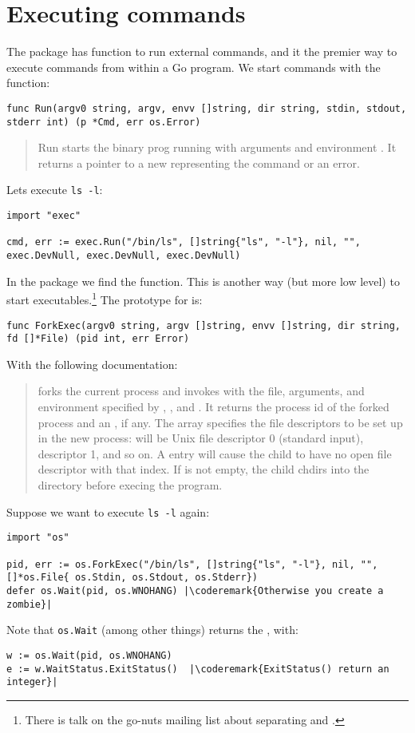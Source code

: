 \section{Executing commands}
The  package has function to run external commands, and it the premier way to
execute commands from within a Go program. We start commands with 
the  function:
\begin{lstlisting}
func Run(argv0 string, argv, envv []string, dir string, stdin, stdout, stderr int) (p *Cmd, err os.Error)
\end{lstlisting}
\begin{quote}
Run starts the binary prog running with
arguments  and environment .
It returns a pointer to a new  representing the command or an error.
\end{quote}
Lets execute \verb|ls -l|:
\begin{lstlisting}
import "exec"

cmd, err := exec.Run("/bin/ls", []string{"ls", "-l"}, nil, "", exec.DevNull, exec.DevNull, exec.DevNull)
\end{lstlisting}
In the  package we find the  function. This
is another way (but more low level) to start executables.\footnote{There is talk on
the go-nuts mailing list about separating  and
.} 
The prototype for  is:
\begin{lstlisting}
func ForkExec(argv0 string, argv []string, envv []string, dir string, fd []*File) (pid int, err Error)
\end{lstlisting}
With the following documentation:
\begin{quote}
 forks the current process and invokes  with the
file, arguments, and environment specified by , , and
. It returns the process id of the forked process and an
, if any. The  array specifies the file descriptors to be
set up in the new process:  will be Unix file descriptor 0 (standard
input),  descriptor 1, and so on.  A  entry will cause the
child to have no open file descriptor with that index.  If  is not
empty, the child chdirs into the directory before execing the program.
\end{quote}
Suppose we want to execute \verb|ls -l| again:
\begin{lstlisting}
import "os"

pid, err := os.ForkExec("/bin/ls", []string{"ls", "-l"}, nil, "", []*os.File{ os.Stdin, os.Stdout, os.Stderr})
defer os.Wait(pid, os.WNOHANG) |\coderemark{Otherwise you create a zombie}|
\end{lstlisting}
Note that \lstinline{os.Wait} (among other things) returns the
, with:
\begin{lstlisting}
w := os.Wait(pid, os.WNOHANG)
e := w.WaitStatus.ExitStatus()  |\coderemark{ExitStatus() return an integer}|
\end{lstlisting}

